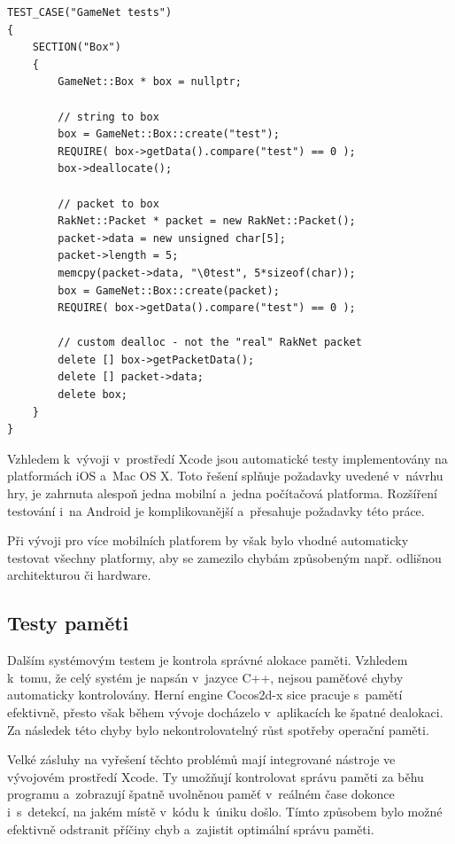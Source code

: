 \documentclass[thesis=B,czech,hidelinks]{FITthesis}[2012/06/26] %
\begin{document}
\begin{verbatim}
TEST_CASE("GameNet tests")
{
    SECTION("Box") 
    { 
        GameNet::Box * box = nullptr;
        
        // string to box
        box = GameNet::Box::create("test");
        REQUIRE( box->getData().compare("test") == 0 );
        box->deallocate();
        
        // packet to box
        RakNet::Packet * packet = new RakNet::Packet();
        packet->data = new unsigned char[5];
        packet->length = 5;
        memcpy(packet->data, "\0test", 5*sizeof(char));
        box = GameNet::Box::create(packet);
        REQUIRE( box->getData().compare("test") == 0 );
		
        // custom dealloc - not the "real" RakNet packet
        delete [] box->getPacketData();
        delete [] packet->data;
        delete box;
    }
}
\end{verbatim}

Vzhledem k~vývoji v~prostředí Xcode jsou automatické testy implementovány na platformách iOS a~Mac OS X. Toto řešení splňuje požadavky uvedené v~návrhu hry, je zahrnuta alespoň jedna mobilní a~jedna počítačová platforma. Rozšíření testování i~na Android je komplikovanější a~přesahuje požadavky této práce.

Při vývoji pro více mobilních platforem by však bylo vhodné automaticky testovat všechny platformy, aby se zamezilo chybám způsobeným např. odlišnou architekturou či hardware.

\subsection{Testy paměti}

Dalším systémovým testem je kontrola správné alokace paměti. Vzhledem k~tomu, že celý systém je napsán v~jazyce C++, nejsou paměťové chyby automaticky kontrolovány. Herní engine Cocos2d-x sice pracuje s~pamětí efektivně, přesto však během vývoje docházelo v~aplikacích ke špatné dealokaci. Za následek této chyby bylo nekontrolovatelný růst spotřeby operační paměti.

Velké zásluhy na vyřešení těchto problémů mají integrované nástroje ve vývojovém prostředí Xcode. Ty umožňují kontrolovat správu paměti za běhu programu a~zobrazují špatně uvolněnou paměť v~reálném čase dokonce i~s~detekcí, na jakém místě v~kódu k~úniku došlo. Tímto způsobem bylo možné efektivně odstranit příčiny chyb a~zajistit optimální správu paměti.
\end{document}
